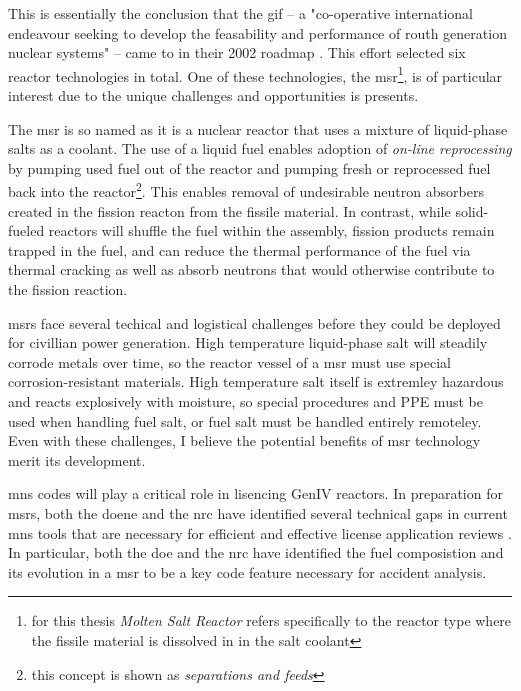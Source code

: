 This is essentially the conclusion that the \Gls{gif} -- a "co-operative international endeavour seeking to develop the feasability and performance of routh generation nuclear systems" \cite{gif_homepage} -- came to in their 2002 roadmap \cite{doe-ne_technology_2002}. This effort selected six reactor technologies in total. One of these technologies, the \Gls{msr}\footnote{for this thesis {\it Molten Salt Reactor} refers specifically to the reactor type where the fissile material is dissolved in in the salt
coolant}, is of particular interest due to the unique challenges and opportunities is presents.

The \Gls{msr} is so named as it is a nuclear reactor that uses a mixture of liquid-phase salts as a coolant. The use of a liquid fuel enables adoption of {\it on-line reprocessing} by pumping used fuel out of the reactor and pumping fresh or reprocessed fuel back into the reactor\footnote{this concept is shown as {\it separations and feeds}}. This enables removal of undesirable neutron absorbers created in the fission reacton from the fissile material. In contrast, while solid-fueled reactors will shuffle
    the fuel within the assembly, fission products remain trapped in the fuel, and can reduce the thermal performance of the fuel via thermal cracking as well as absorb neutrons that would otherwise contribute to the fission reaction. 

    \Gls{msr}s face several techical and logistical challenges before they could be deployed for civillian power generation. High temperature liquid-phase salt will steadily corrode metals over time, so  the reactor vessel of a \Gls{msr} must use special corrosion-resistant materials. High temperature salt itself is extremley hazardous and reacts explosively with moisture, so special procedures and PPE must be used when handling fuel salt, or fuel salt must be handled entirely
    remoteley. Even with these challenges, I believe the potential benefits of \Gls{msr} technology merit its development.

\Gls{mns} codes will play a critical role in lisencing GenIV reactors. In preparation for \Gls{msr}s, both the \Gls{doene} and the \Gls{nrc} have identified several technical gaps in current \Gls{mns} tools that are necessary for efficient and effective license application reviews \cite{betzler_modeling_2019} \cite{usnrc_nonlwr_2020-1}. In particular, both the \Gls{doe} and the \Gls{nrc} have identified the fuel composistion and its evolution in a \Gls{msr} to be a key code feature
necessary for accident analysis. 

